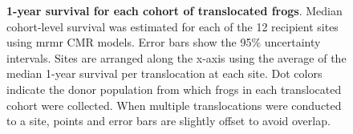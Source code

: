 \documentclass[
  letterpaper,
  DIV=11,
  numbers=noendperiod]{scrartcl}
\begin{document}
\newpage

\begin{figure}


\caption{\label{fig-translocation-survival}\textbf{1-year survival for
each cohort of translocated frogs}. Median cohort-level survival was
estimated for each of the 12 recipient sites using mrmr CMR models.
Error bars show the 95\% uncertainty intervals. Sites are arranged along
the x-axis using the average of the median 1-year survival per
translocation at each site. Dot colors indicate the donor population
from which frogs in each translocated cohort were collected. When
multiple translocations were conducted to a site, points and error bars
are slightly offset to avoid overlap.}

\end{figure}%

\newpage
\end{document}
